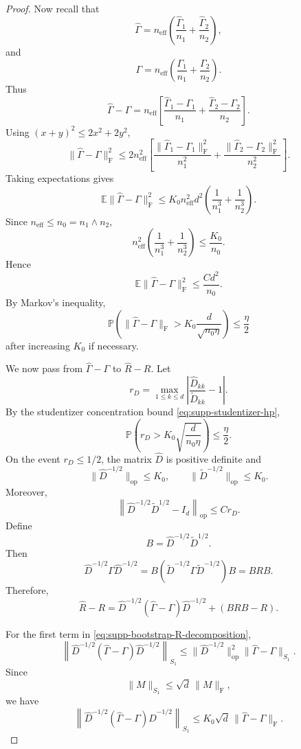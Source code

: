 \documentclass[
  12pt]{article}
\theoremstyle{plain}
\theoremstyle{definition}
\theoremstyle{remark}
\begin{document}
\begin{proof}
Now recall that
\[
\widehat\Gamma
=
n_{\mathrm{eff}}
\left(
\frac{\widehat\Gamma_1}{n_1}
+
\frac{\widehat\Gamma_2}{n_2}
\right),
\]
and
\[
\Gamma
=
n_{\mathrm{eff}}
\left(
\frac{\Gamma_1}{n_1}
+
\frac{\Gamma_2}{n_2}
\right).
\]
Thus
\[
\widehat\Gamma-\Gamma
=
n_{\mathrm{eff}}
\left[
\frac{\widehat\Gamma_1-\Gamma_1}{n_1}
+
\frac{\widehat\Gamma_2-\Gamma_2}{n_2}
\right].
\]
Using \((x+y)^2\le 2x^2+2y^2\),
\[
\|\widehat\Gamma-\Gamma\|_{\mathrm F}^2
\le
2n_{\mathrm{eff}}^2
\left[
\frac{\|\widehat\Gamma_1-\Gamma_1\|_{\mathrm F}^2}{n_1^2}
+
\frac{\|\widehat\Gamma_2-\Gamma_2\|_{\mathrm F}^2}{n_2^2}
\right].
\]
Taking expectations gives
\[
\mathbb E\|\widehat\Gamma-\Gamma\|_{\mathrm F}^2
\le
K_0 n_{\mathrm{eff}}^2 d^2
\left(
\frac1{n_1^3}
+
\frac1{n_2^3}
\right).
\]
Since \(n_{\mathrm{eff}}\le n_0=n_1\wedge n_2\),
\[
n_{\mathrm{eff}}^2
\left(
\frac1{n_1^3}
+
\frac1{n_2^3}
\right)
\le
\frac{K_0}{n_0}.
\]
Hence
\[
\mathbb E\|\widehat\Gamma-\Gamma\|_{\mathrm F}^2
\le
\frac{Cd^2}{n_0}.
\]
By Markov's inequality,
\begin{equation}
\label{eq:supp-bootstrap-gamma-hp}
\mathbb P
\left(
\|\widehat\Gamma-\Gamma\|_{\mathrm F}
>
K_0\frac{d}{\sqrt{n_0\eta}}
\right)
\le
\frac{\eta}{2}
\end{equation}
after increasing \(K_0\) if necessary.

We now pass from \(\widehat\Gamma-\Gamma\) to
\(\widehat R-R\). Let
\[
r_D
=
\max_{1\le k\le d}
\left|
\frac{\widehat D_{kk}}{\widetilde D_{kk}}-1
\right|.
\]
By the studentizer concentration bound \eqref{eq:supp-studentizer-hp},
\begin{equation}
\label{eq:supp-bootstrap-rd-hp}
\mathbb P
\left(
r_D>
K_0\sqrt{\frac{d}{n_0\eta}}
\right)
\le
\frac{\eta}{2}.
\end{equation}
On the event \(r_D\le 1/2\), the matrix \(\widehat D\) is positive definite and
\[
\|\widehat D^{-1/2}\|_{\mathrm{op}}\le K_0,
\qquad
\|\widetilde D^{-1/2}\|_{\mathrm{op}}\le K_0.
\]
Moreover,
\[
\left\|
\widehat D^{-1/2}\widetilde D^{1/2}-I_d
\right\|_{\mathrm{op}}
\le
Cr_D.
\]
Define
\[
B=\widehat D^{-1/2}\widetilde D^{1/2}.
\]
Then
\[
\widehat D^{-1/2}\Gamma\widehat D^{-1/2}
=
B
\left(
\widetilde D^{-1/2}\Gamma\widetilde D^{-1/2}
\right)
B
=
BRB.
\]
Therefore,
\begin{equation}
\label{eq:supp-bootstrap-R-decomposition}
\widehat R-R
=
\widehat D^{-1/2}(\widehat\Gamma-\Gamma)\widehat D^{-1/2}
+
(BRB-R).
\end{equation}

For the first term in \eqref{eq:supp-bootstrap-R-decomposition},
\[
\left\|
\widehat D^{-1/2}(\widehat\Gamma-\Gamma)\widehat D^{-1/2}
\right\|_{S_1}
\le
\|\widehat D^{-1/2}\|_{\mathrm{op}}^2
\|\widehat\Gamma-\Gamma\|_{S_1}.
\]
Since
\[
\|M\|_{S_1}\le \sqrt d\,\|M\|_{\mathrm F},
\]
we have
\[
\left\|
\widehat D^{-1/2}(\widehat\Gamma-\Gamma)\widehat D^{-1/2}
\right\|_{S_1}
\le
K_0\sqrt d\,\|\widehat\Gamma-\Gamma\|_{\mathrm F}.
\]


\end{proof}
\end{document}
